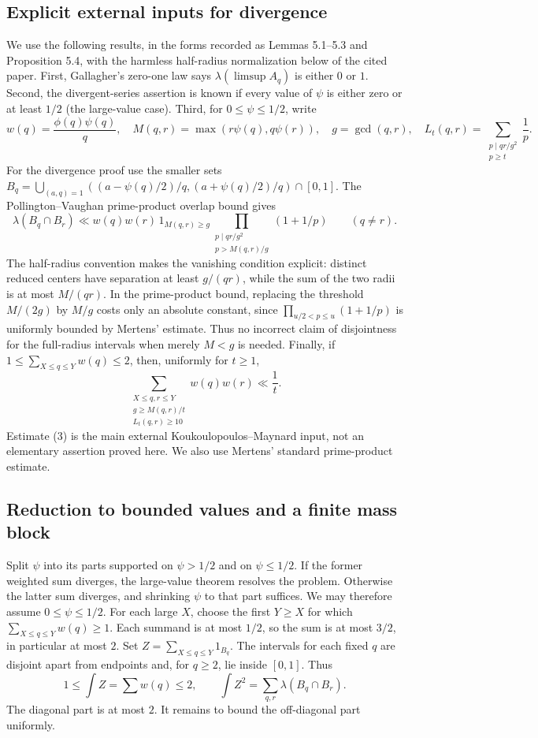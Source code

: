\subsection*{Explicit external inputs for divergence}
We use the following results, in the forms recorded as Lemmas 5.1--5.3 and Proposition 5.4, with the harmless half-radius normalization below of the cited paper.
First, Gallagher's zero-one law says $\lambda(\limsup A_q)$ is either $0$ or $1$.
Second, the divergent-series assertion is known if every value of $\psi$ is either zero or at least $1/2$ (the large-value case).
Third, for $0\le\psi\le1/2$, write
\[
 w(q)=\frac{\phi(q)\psi(q)}q,\quad
 M(q,r)=\max(r\psi(q),q\psi(r)),\quad g=\gcd(q,r),\quad
 L_t(q,r)=\sum_{\substack{p\mid qr/g^2\\p\ge t}}\frac1p.
\]
For the divergence proof use the smaller sets
$B_q=\bigcup_{(a,q)=1}((a-\psi(q)/2)/q,(a+\psi(q)/2)/q)\cap[0,1]$.
The Pollington--Vaughan prime-product overlap bound gives
\[
 \lambda(B_q\cap B_r)\ll
 w(q)w(r)\,1_{M(q,r)\ge g}
 \prod_{\substack{p\mid qr/g^2\\p>M(q,r)/g}}(1+1/p)
 \qquad(q\ne r).
 \tag{2}
\]
The half-radius convention makes the vanishing condition explicit: distinct reduced centers have separation at least $g/(qr)$, while the sum of the two radii is at most $M/(qr)$. In the prime-product bound, replacing the threshold $M/(2g)$ by $M/g$ costs only an absolute constant, since $\prod_{u/2<p\le u}(1+1/p)$ is uniformly bounded by Mertens' estimate. Thus no incorrect claim of disjointness for the full-radius intervals when merely $M<g$ is needed.
Finally, if $1\le\sum_{X\le q\le Y}w(q)\le2$, then, uniformly for $t\ge1$,
\[
 \sum_{\substack{X\le q,r\le Y\\
 g\ge M(q,r)/t\\L_t(q,r)\ge10}}w(q)w(r)\ll\frac1t.
 \tag{3}
\]
Estimate (3) is the main external Koukoulopoulos--Maynard input, not an elementary assertion proved here. We also use Mertens' standard prime-product estimate.

\subsection*{Reduction to bounded values and a finite mass block}
Split $\psi$ into its parts supported on $\psi>1/2$ and on $\psi\le1/2$.
If the former weighted sum diverges, the large-value theorem resolves the problem. Otherwise the latter sum diverges, and shrinking $\psi$ to that part suffices.
We may therefore assume $0\le\psi\le1/2$.
For each large $X$, choose the first $Y\ge X$ for which
$\sum_{X\le q\le Y}w(q)\ge1$. Each summand is at most $1/2$, so the sum is at most $3/2$, in particular at most $2$.
Set $Z=\sum_{X\le q\le Y}1_{B_q}$. The intervals for each fixed $q$ are disjoint apart from endpoints and, for $q\ge2$, lie inside $[0,1]$. Thus
\[
 1\le\int Z=\sum w(q)\le2,\qquad
 \int Z^2=\sum_{q,r}\lambda(B_q\cap B_r).
 \tag{4}
\]
The diagonal part is at most $2$. It remains to bound the off-diagonal part uniformly.

